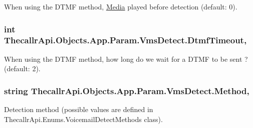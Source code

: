 When using the D\+T\+M\+F method, \hyperlink{namespace_thecallr_api_1_1_objects_1_1_media}{Media} played before detection (default\+: 0). 

\hypertarget{class_thecallr_api_1_1_objects_1_1_app_1_1_param_1_1_vms_detect_a53e8d617ee0f2ec11d8558dc2281916f}{
\subsubsection[{Dtmf\+Timeout}]{\setlength{\rightskip}{0pt plus 5cm}int Thecallr\+Api.\+Objects.\+App.\+Param.\+Vms\+Detect.\+Dtmf\+Timeout\hspace{0.3cm}{\ttfamily [get]}, {\ttfamily [set]}}}\label{class_thecallr_api_1_1_objects_1_1_app_1_1_param_1_1_vms_detect_a53e8d617ee0f2ec11d8558dc2281916f}


When using the D\+T\+M\+F method, how long do we wait for a D\+T\+M\+F to be sent ? (default\+: 2). 

\hypertarget{class_thecallr_api_1_1_objects_1_1_app_1_1_param_1_1_vms_detect_a28bb04ac4daf562d199331ca3ca7d89a}{
\subsubsection[{Method}]{\setlength{\rightskip}{0pt plus 5cm}string Thecallr\+Api.\+Objects.\+App.\+Param.\+Vms\+Detect.\+Method\hspace{0.3cm}{\ttfamily [get]}, {\ttfamily [set]}}}\label{class_thecallr_api_1_1_objects_1_1_app_1_1_param_1_1_vms_detect_a28bb04ac4daf562d199331ca3ca7d89a}


Detection method (possible values are defined in Thecallr\+Api.\+Enums.\+Voicemail\+Detect\+Methods class). 

